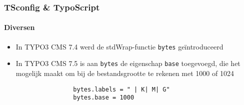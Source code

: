 \begin{frame}[fragile]
	\frametitle{TSconfig \& TypoScript}
	\framesubtitle{Diversen}

	\begin{itemize}

		\item In TYPO3 CMS 7.4 werd de stdWrap-functie \texttt{bytes} geïntroduceerd

		\item In TYPO3 CMS 7.5 is aan \texttt{bytes} de eigenschap \texttt{base} toegevoegd,
			die het mogelijk maakt om bij de bestandsgrootte te rekenen met 1000 of 1024

			\begin{lstlisting}
				bytes.labels = " | K| M| G"
				bytes.base = 1000
			\end{lstlisting}

	\end{itemize}

\end{frame}

